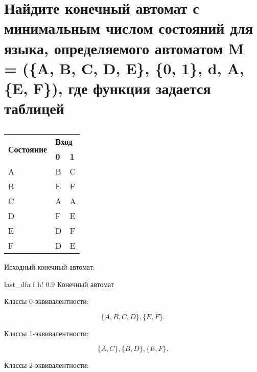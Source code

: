 \section{Найдите конечный автомат с минимальным числом состояний для языка, определяемого автоматом M = (\{A, B, C, D, E\}, \{0, 1\}, d, A, \{E, F\}), где функция задается таблицей}

\begin{table}[h!]
\caption{}
\label{tab:my-table}
\begin{tabular}{|l|ll|}
\hline
\multirow{2}{*}{\textbf{Состояние}} & \multicolumn{2}{l|}{\textbf{Вход}}           \\ \cline{2-3} 
                                    & \multicolumn{1}{l|}{\textbf{0}} & \textbf{1} \\ \hline
A                                   & \multicolumn{1}{l|}{B}          & C          \\ \hline
B                                   & \multicolumn{1}{l|}{E}          & F          \\ \hline
C                                   & \multicolumn{1}{l|}{A}          & A          \\ \hline
D                                   & \multicolumn{1}{l|}{F}          & E          \\ \hline
E                                   & \multicolumn{1}{l|}{D}          & F          \\ \hline
F                                   & \multicolumn{1}{l|}{D}          & E          \\ \hline
\end{tabular}
\end{table}

Исходный конечный автомат:

    {last_dfa}
    {f}
    {h!}
    {0.9\textwidth}
    {Конечный автомат}

Классы 0-эквивалентности:

\begin{equation*}
\{A, B, C, D\}, \{E, F\}.
\end{equation*}

Классы 1-эквивалентности:

\begin{equation*}
\{A, C\}, \{B, D\}, \{E, F\}.
\end{equation*}

Классы 2-эквивалентности:

